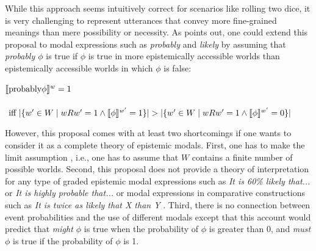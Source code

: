 While this approach seems intuitively correct for scenarios like rolling two dice, it is very challenging to represent utterances
that convey more fine-grained meanings than mere possibility or necessity. As \cite{Lassiter2017} points out, one could extend this proposal
to modal expressions such as \textit{probably} and \textit{likely} by assuming that \textit{probably $\phi$} is true if $\phi$ is true in more 
epistemically accessible worlds than epistemically accessible worlds in which $\phi$ is false:
\begin{exe}
\ex $\llbracket\mbox{probably} \phi\rrbracket^{w}  = 1 $ \\ 
 \ \ \ \ \ \ \ \ $ \mbox{ iff } |\{w' \in W \mid wRw' = 1 \land \llbracket\phi\rrbracket^{w'} = 1\}| > |\{w' \in W \mid wRw' = 1 \land \llbracket\phi\rrbracket^{w'} = 0\}|$
\end{exe}
However, this proposal comes with at least two shortcomings if one wants to consider it as a 
complete theory of epistemic modals. First, one has to make the limit assumption \cite{Lewis1981}, i.e., 
one has to assume that $W$ contains a finite number of possible worlds. Second, this proposal does not provide 
a theory of interpretation for any type of graded epistemic modal expressions such as \textit{It is 60\% likely that...} or \textit{It is highly probable that...}
or modal expressions in comparative constructions such as \textit{It is twice as likely that X than Y} \cite{Lassiter2017}. Third, there
is no connection between event probabilities and the use of different modals except that this account would predict that \textit{might $\phi$} is true
when the probability of $\phi$ is greater than 0, and \textit{must $\phi$} is true if the probability of $\phi$ is 1.


